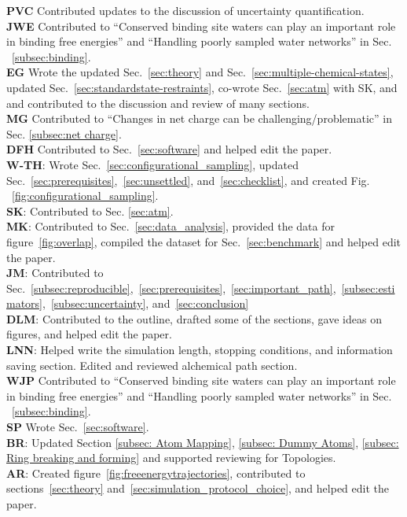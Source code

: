 \documentclass[9pt,bestpractices]{livecoms}
\begin{document}
\textbf{PVC} Contributed updates to the discussion of uncertainty quantification.\\
\textbf{JWE} Contributed to ``Conserved binding site waters can play an important role in binding free energies'' and ``Handling poorly sampled water networks'' in Sec. ~\ref{subsec:binding}.\\
\textbf{EG} Wrote the updated Sec.~\ref{sec:theory} and Sec.~\ref{sec:multiple-chemical-states},  updated Sec.~\ref{sec:standardstate-restraints}, co-wrote Sec.~\ref{sec:atm} with SK, and and contributed to the discussion and review of many sections.\\
\textbf{MG} Contributed to ``Changes in net charge can be challenging/problematic'' in Sec. \ref{subsec:net charge}. \\
\textbf{DFH} Contributed to Sec.~\ref{sec:software} and helped edit the paper. \\
\textbf{W-TH}: Wrote Sec.~\ref{sec:configurational_sampling}, updated Sec.~\ref{sec:prerequisites},~\ref{sec:unsettled}, and~\ref{sec:checklist}, and created Fig. ~\ref{fig:configurational_sampling}.\\
\textbf{SK}: Contributed to Sec. \ref{sec:atm}.\\
\textbf{MK}: Contributed to Sec.~\ref{sec:data_analysis}, provided the data for figure~\ref{fig:overlap}, compiled the dataset for Sec.~\ref{sec:benchmark} and helped edit the paper.\\
\textbf{JM}: Contributed to Sec.~\ref{subsec:reproducible},~\ref{sec:prerequisites},~\ref{sec:important_path},~\ref{subsec:estimators},~\ref{subsec:uncertainty}, and~\ref{sec:conclusion}\\
\textbf{DLM}: Contributed to the outline, drafted some of the sections, gave ideas on figures, and helped edit the paper.\\
\textbf{LNN}: Helped write the simulation length, stopping conditions, and information saving section. Edited and reviewed alchemical path section.\\
\textbf{WJP} Contributed to ``Conserved binding site waters can play an important role in binding free energies'' and ``Handling poorly sampled water networks'' in Sec. ~\ref{subsec:binding}.\\
\textbf{SP} Wrote Sec.~\ref{sec:software}. \\
\textbf{BR}: Updated Section \ref{subsec: Atom Mapping}, \ref{subsec: Dummy Atoms}, \ref{subsec: Ring breaking and forming} and supported reviewing for Topologies.\\
\textbf{AR}: Created figure~\ref{fig:freeenergytrajectories}, contributed to sections~\ref{sec:theory} and~\ref{sec:simulation_protocol_choice}, and helped edit the paper.\\
\end{document}
